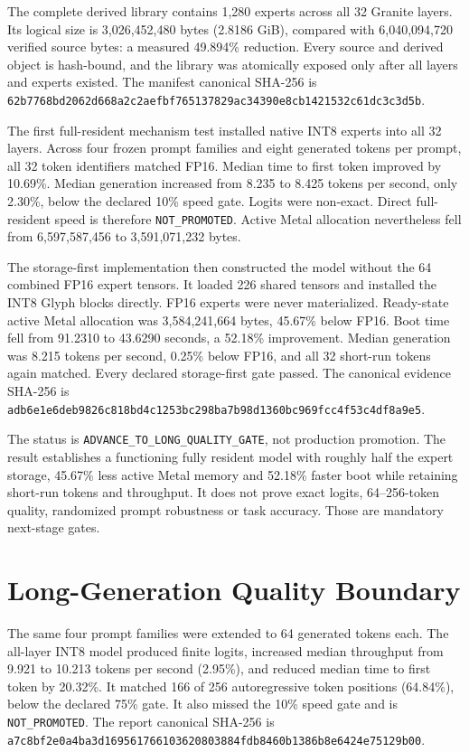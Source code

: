 The complete derived library contains 1,280 experts across all 32 Granite
layers. Its logical size is 3,026,452,480 bytes (2.8186 GiB), compared with
6,040,094,720 verified source bytes: a measured 49.894\% reduction. Every source
and derived object is hash-bound, and the library was atomically exposed only
after all layers and experts existed. The manifest canonical SHA-256 is
\texttt{62b7768bd2062d668a2c2aefbf765137829ac34390e8cb1421532c61dc3c3d5b}.

The first full-resident mechanism test installed native INT8 experts into all
32 layers. Across four frozen prompt families and eight generated tokens per
prompt, all 32 token identifiers matched FP16. Median time to first token
improved by 10.69\%. Median generation increased from 8.235 to 8.425 tokens per
second, only 2.30\%, below the declared 10\% speed gate. Logits were non-exact.
Direct full-resident speed is therefore \texttt{NOT\_PROMOTED}. Active Metal
allocation nevertheless fell from 6,597,587,456 to 3,591,071,232 bytes.

The storage-first implementation then constructed the model without the 64
combined FP16 expert tensors. It loaded 226 shared tensors and installed the
INT8 Glyph blocks directly. FP16 experts were never materialized. Ready-state
active Metal allocation was 3,584,241,664 bytes, 45.67\% below FP16. Boot time
fell from 91.2310 to 43.6290 seconds, a 52.18\% improvement. Median generation
was 8.215 tokens per second, 0.25\% below FP16, and all 32 short-run tokens again
matched. Every declared storage-first gate passed. The canonical evidence
SHA-256 is
\texttt{adb6e1e6deb9826c818bd4c1253bc298ba7b98d1360bc969fcc4f53c4df8a9e5}.

The status is \texttt{ADVANCE\_TO\_LONG\_QUALITY\_GATE}, not production
promotion. The result establishes a functioning fully resident model with
roughly half the expert storage, 45.67\% less active Metal memory and 52.18\%
faster boot while retaining short-run tokens and throughput. It does not prove
exact logits, 64--256-token quality, randomized prompt robustness or task
accuracy. Those are mandatory next-stage gates.

\section{Long-Generation Quality Boundary}
\label{sec:int8-long-quality-boundary}

The same four prompt families were extended to 64 generated tokens each. The
all-layer INT8 model produced finite logits, increased median throughput from
9.921 to 10.213 tokens per second (2.95\%), and reduced median time to first
token by 20.32\%. It matched 166 of 256 autoregressive token positions
(64.84\%), below the declared 75\% gate. It also missed the 10\% speed gate and
is \texttt{NOT\_PROMOTED}. The report canonical SHA-256 is
\texttt{a7c8bf2e0a4ba3d169561766103620803884fdb8460b1386b8e6424e75129b00}.

